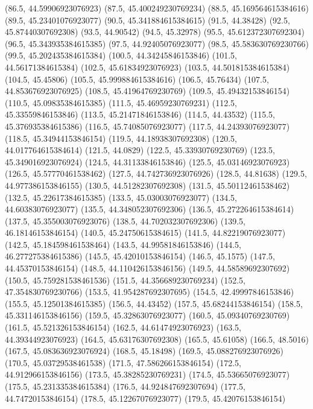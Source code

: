 {{{		(86.5, 44.59906923076923)
		(87.5, 45.400249230769234)
		(88.5, 45.169564615384616)
		(89.5, 45.23401076923077)
		(90.5, 45.341884615384615)
		(91.5, 44.38428)
		(92.5, 45.87440307692308)
		(93.5, 44.90542)
		(94.5, 45.32978)
		(95.5, 45.612372307692304)
		(96.5, 45.343935384615385)
		(97.5, 44.92405076923077)
		(98.5, 45.583630769230766)
		(99.5, 45.202435384615384)
		(100.5, 44.34245846153846)
		(101.5, 44.56171384615384)
		(102.5, 45.61834923076923)
		(103.5, 44.501815384615384)
		(104.5, 45.45806)
		(105.5, 45.999884615384616)
		(106.5, 45.76434)
		(107.5, 44.853676923076925)
		(108.5, 45.41964769230769)
		(109.5, 45.49432153846154)
		(110.5, 45.09835384615385)
		(111.5, 45.46959230769231)
		(112.5, 45.33559846153846)
		(113.5, 45.21471846153846)
		(114.5, 44.43532)
		(115.5, 45.376935384615386)
		(116.5, 45.74085076923077)
		(117.5, 44.24393076923077)
		(118.5, 45.34944153846154)
		(119.5, 44.18938307692308)
		(120.5, 44.017764615384614)
		(121.5, 44.0829)
		(122.5, 45.33930769230769)
		(123.5, 45.349016923076924)
		(124.5, 44.31133846153846)
		(125.5, 45.03146923076923)
		(126.5, 45.57770461538462)
		(127.5, 44.742736923076926)
		(128.5, 44.81638)
		(129.5, 44.977386153846155)
		(130.5, 44.51282307692308)
		(131.5, 45.50112461538462)
		(132.5, 45.22617384615385)
		(133.5, 45.03003076923077)
		(134.5, 44.60383076923077)
		(135.5, 44.348052307692306)
		(136.5, 45.272264615384614)
		(137.5, 45.355003076923076)
		(138.5, 44.702032307692306)
		(139.5, 46.18146153846154)
		(140.5, 45.24750615384615)
		(141.5, 44.82219076923077)
		(142.5, 45.184598461538464)
		(143.5, 44.99581846153846)
		(144.5, 46.277275384615386)
		(145.5, 45.42010153846154)
		(146.5, 45.1575)
		(147.5, 44.45370153846154)
		(148.5, 44.110426153846156)
		(149.5, 44.58589692307692)
		(150.5, 45.759281538461536)
		(151.5, 44.356689230769234)
		(152.5, 47.354830769230766)
		(153.5, 41.954287692307695)
		(154.5, 42.49997846153846)
		(155.5, 45.12501384615385)
		(156.5, 44.43452)
		(157.5, 45.68244153846154)
		(158.5, 45.331146153846156)
		(159.5, 45.32863076923077)
		(160.5, 45.09340769230769)
		(161.5, 45.521326153846154)
		(162.5, 44.61474923076923)
		(163.5, 44.39344923076923)
		(164.5, 45.63176307692308)
		(165.5, 45.61058)
		(166.5, 48.5016)
		(167.5, 45.083636923076924)
		(168.5, 45.18498)
		(169.5, 45.088276923076926)
		(170.5, 45.03729538461538)
		(171.5, 47.586266153846154)
		(172.5, 44.912966153846156)
		(173.5, 45.38285230769231)
		(174.5, 45.53665076923077)
		(175.5, 45.231335384615384)
		(176.5, 44.924847692307694)
		(177.5, 44.74720153846154)
		(178.5, 45.12267076923077)
		(179.5, 45.42076153846154)
}}}
